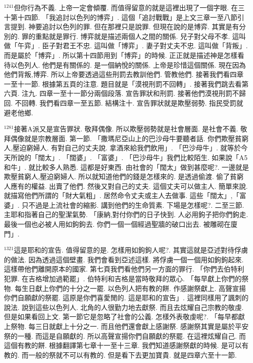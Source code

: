\documentclass{book}
\begin{document}
$^{1241}$但你行為不義.
上帝一定會傾覆.
而值得留意的就是這裡出現了一個字眼.
在三十第十四節.
「我追討以色列的博弈」.
這個「追討戰戰」是上文三章一至八節引言提到.
神要追討以色列的罪.
但在那裡只是說罪.
但現在說的是博弈.
其實是有分別的.
罪的重點就是罪行.
博弈就是描述兩個人之間的關係.
兒子對父母不孝.
這叫做「午弈」.
臣子對君王不忠.
這叫做「博弈」.
妻子對丈夫不忠.
這叫做「背叛」.
而是屬於「博弈」.
所以第十四節用到「博弈」的時候.
正正就是描述神是怎樣看待以色列人.
他們是有關係的.
是一個納悅的關係.
上帝是珍惜這個關係.
現在因為他們背叛,博弈.
所以上帝要透過這些刑罰去教訓他們.
管教他們.
接著我們看四章一至十一節.
根據第五頁的注意.
題目就是「漠視刑罰不回轉」.
接著我們跳去看第六頁.
注九.
四章一至十一節分兩個段落.
宣告罪狀和刑罰.
接著他們漠視刑罰不歸回.
不回轉.
我們看四章一至五節.
結構注十.
宣告罪狀就是欺壓弱勢.
指民受罰就避老他鄉.

$^{1281}$接著A派又是宣告罪狀.
敬拜偶像.
所以欺壓弱勢就是社會層面.
是社會不義.
敬拜偶像就是宗教層面.
第一節.
「撒瑪尼亞山上的巴沙母牛要聽者話.
你們欺壓貧窮人,壓迫窮婦人.
有對自己的丈夫說.
拿酒來給我們飲用」.
「巴沙母牛」.
就等於今天所說的「闊太」.
「闊婆」.
「富婆」.
「巴沙母牛」我們比較陌生.
如果說「A5和牛」.
就比較多人熟悉.
這都是好東西.
由社會的「闊太」做到甚麼呢?.
一邊就是欺壓貧窮人,壓迫窮婦人.
所以就知道他們的錢是怎樣來的.
是透過偷渡.
偷了貧窮人應有的權益.
出賣了他們.
然後又對自己的丈夫.
這個丈夫可以做主人.
簡單來說.
就描寫他們所謂的「財大氣粗」.
居然命令丈夫或主人去做事.
這些「闊太」,「富婆」.
只不過是上流社會的縮影.
講到他們的生命質素.
下場是怎樣呢?.
二至三節.
主耶和指著自己的聖潔氣勢.
「康納,對付你們的日子快到.
人必用鉤子把你們鉤走.
最後一個也必被人用如鉤鉤去.
你們一個一個經過聖牆的破口出去.
被雕砌在廈門」.

$^{1321}$這是耶和的宣告.
值得留意的是.
怎樣用如鉤鉤人呢?.
其實這就是亞述對待俘虜的做法.
因為透過這個壁畫.
我們會看到亞述這樣.
將俘虜一個一個用如鉤鉤起來.
這樣帶他們離開原本的國家.
第七頁我們看他們另一方面的罪行.
「你們去伯特利犯罪.
在吉格增加過範罷」.
伯特利和吉格是當時敬拜的眾心.
「每早獻上你們的祭物.
每生日獻上你們的十分之一罷.
以色列人把有教的餅.
作感謝祭獻上.
高聲宣揚你們自願獻的祭罷.
這原是你們喜愛閒的.
這是耶和的宣告」.
這裡同樣用了諷刺的說法.
說到這些以色列人.
北角的人很勤力地去獻祭.
而且去炫耀自己宗教的敬虔.
但是如果看回上文.
第一節它是忽略了社會的公義.
怎樣外表敬虔呢?.
「每早都獻上祭物.
每三日就獻上十分之一.
而且他們還會獻上感謝祭.
感謝祭其實是屬於平安祭的一種.
而這是自願獻的.
所以高聲宣揚你們自願獻的祭罷.
在這裡炫耀自己.
而這個有教的餅.
根據翻譯第七章十一至十三章.
我們知道感謝祭獻的時候.
是可以有教的.
而一般的祭就不可以有教的.
但是看下去更加寶貴.
就是四章六至十一節.
\end{document}
